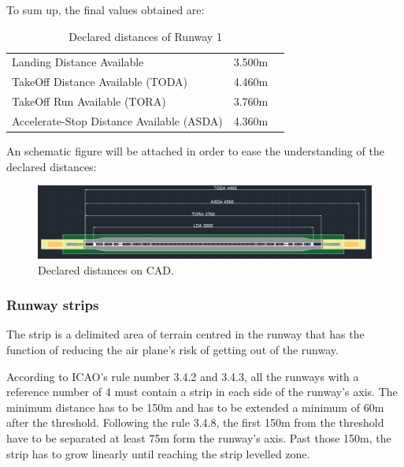 			To sum up, the final values obtained are:
			
			\begin{table}[htb]
				\centering
				\begin{tabular}{ll p{5cm}}
					\midrule[2pt]
					Landing Distance Available & 3.500m\\
					TakeOff Distance Available (TODA) & 4.460m\\
					TakeOff Run Available (TORA)& 3.760m \\
					Accelerate-Stop Distance Available (ASDA)& 4.360m\\
					\bottomrule[2pt]
				\end{tabular}
				\caption{Declared distances of  Runway 1}
				\label{DeclareddistancesRW1}
			\end{table}
			
			An schematic figure will be attached in order to ease the understanding of the declared distances:
			
			\begin{figure}[H]
				\centering
				\includegraphics[clip, trim=0cm 0cm 0cm 0cm, width=1\textwidth]{./images/declareddistances/pista}
				\caption{Declared distances on CAD.} %
				\label{} %
			\end{figure}
			
			\subsubsection{Runway strips}
			The strip is a delimited area of terrain centred in the runway that has the function of reducing the air plane's risk of getting out of the runway.
			
			According to ICAO's rule number 3.4.2 and 3.4.3, all the runways with a reference number of 4 must contain a strip in each side of the runway's axis. The minimum distance has to be 150m and has to be extended a minimum of 60m after the threshold. 
			Following the rule 3.4.8, the first 150m from the threshold have to be separated at least 75m form the runway's axis. Past those 150m, the strip has to grow linearly until reaching the strip levelled zone.      
			
